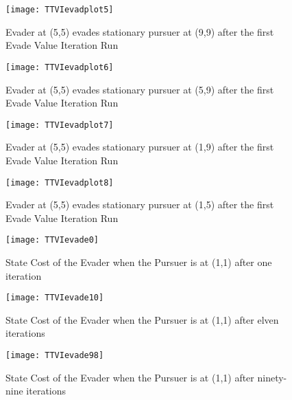 \begin{figure}
\vspace{2.4in}
\centering
\texttt{[image: TTVIevadplot5]}
\caption{Evader at (5,5) evades stationary pursuer at (9,9) after the first Evade Value Iteration Run}
\label{TTVIevadplot5}
\end{figure}
\clearpage
\newpage

\begin{figure}
\vspace{2.4in}
\centering
\texttt{[image: TTVIevadplot6]}
\caption{Evader at (5,5) evades stationary pursuer at (5,9) after the first Evade Value Iteration Run}
\label{TTVIevadplot6}
\end{figure}
\clearpage
\newpage

\begin{figure}
\vspace{2.4in}
\centering
\texttt{[image: TTVIevadplot7]}
\caption{Evader at (5,5) evades stationary pursuer at (1,9) after the first Evade Value Iteration Run}
\label{TTVIevadplot7}
\end{figure}
\clearpage
\newpage

\begin{figure}
\vspace{2.4in}
\centering
\texttt{[image: TTVIevadplot8]}
\caption{Evader at (5,5) evades stationary pursuer at (1,5) after the first Evade Value Iteration Run}
\label{TTVIevadplot8}
\end{figure}
\clearpage
\newpage

\begin{figure}
\vspace{2.4in}
\centering
\texttt{[image: TTVIevade0]}
\caption{State Cost of the Evader when the Pursuer is at (1,1) after one iteration}
\label{TTVIevade0}
\end{figure}
\clearpage
\newpage

\begin{figure}
\vspace{2.4in}
\centering
\texttt{[image: TTVIevade10]}
\caption{State Cost of the Evader when the Pursuer is at (1,1) after elven iterations}
\label{TTVIevade10}
\end{figure}
\clearpage
\newpage

\begin{figure}
\vspace{2.4in}
\centering
\texttt{[image: TTVIevade98]}
\caption{State Cost of the Evader when the Pursuer is at (1,1) after ninety-nine iterations}
\label{TTVIevade98}
\end{figure}
\clearpage
\newpage

